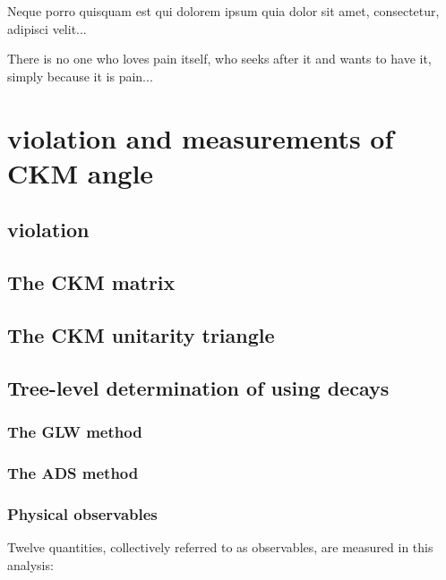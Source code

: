 \begin{savequote}[8cm]
\textlatin{Neque porro quisquam est qui dolorem ipsum quia dolor sit amet, consectetur, adipisci velit...}

There is no one who loves pain itself, who seeks after it and wants to have it, simply because it is pain...
\end{savequote}

\chapter{\label{ch:2-background}\CP violation and measurements of CKM angle \Pgamma} 

\minitoc

\section{\CP violation}

\section{The CKM matrix}

\section{The CKM unitarity triangle}

\section{Tree-level determination of \Pgamma using \decay{\Bpm}{\D\Kstarpm} decays}

\subsection{The GLW method}

\subsection{The ADS method}

\subsection{Physical observables}

Twelve quantities, collectively referred to as \CP observables, are measured in this analysis:

